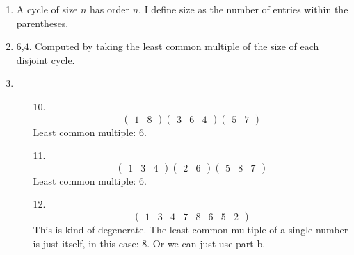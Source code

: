 \documentclass{article}
\begin{document}
\begin{itemize}
\begin{enumerate}[label=\alph*.]
  \item A cycle of size $n$ has order $n$. I define size as the number of
    entries within the parentheses. 
  \item $6$,$4$. Computed by taking the least common multiple of the
    size of each disjoint cycle.
  \item
    \begin{itemize}
    \item [10.]
      \begin{equation*}
        \begin{pmatrix}
          1 & 8
        \end{pmatrix}
        \begin{pmatrix}
          3 & 6 & 4
        \end{pmatrix}
        \begin{pmatrix}
          5 & 7
        \end{pmatrix}
      \end{equation*}
      Least common multiple: 6.
    \item [11.]
      \begin{equation*}
        \begin{pmatrix}
          1 & 3 & 4
        \end{pmatrix}
        \begin{pmatrix}
          2 & 6
        \end{pmatrix}
        \begin{pmatrix}
          5 & 8 & 7
        \end{pmatrix}
      \end{equation*}
      Least common multiple: 6.
    \item [12.]
      \begin{equation*}
        \begin{pmatrix}
          1 & 3 & 4 & 7 & 8 & 6 & 5 & 2
        \end{pmatrix}
      \end{equation*}
      This is kind of degenerate. The least common multiple of a
      single number is just itself, in this case: 8. Or we can just
      use part b.
    \end{itemize}


\end{enumerate}
\end{itemize}
\end{document}
